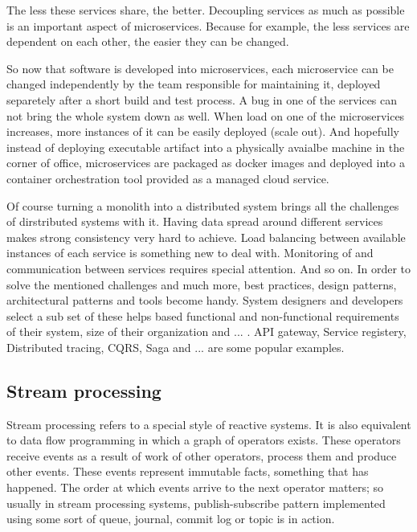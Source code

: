 \documentclass[a4]{report}
\begin{document}
    The less these services share, the better.
    Decoupling services as much as possible is an important aspect of microservices.
    Because for example, the less services are dependent on each other, the easier they can be changed.

    So now that software is developed into microservices, each microservice can be changed independently by the
    team responsible for maintaining it, deployed separetely after a short build and test process.
    A bug in one of the services can not bring the whole system down as well.
    When load on one of the microservices increases, more instances of it can be easily deployed (scale out).
    And hopefully instead of deploying executable artifact into a physically avaialbe machine in the corner of
    office, microservices are packaged as docker images and deployed into a container orchestration tool provided as
    a managed cloud service.

    Of course turning a monolith into a distributed system brings all the challenges of dirstributed systems with it.
    Having data spread around different services makes strong consistency very hard to achieve.
    Load balancing between available instances of each service is something new to deal with.
    Monitoring of and communication between services requires special attention.
    And so on.
    In order to solve the mentioned challenges and much more, best practices, design patterns, architectural patterns
    and tools become handy.
    System designers and developers select a sub set of these helps based functional and non-functional requirements
    of their system, size of their organization and ... .
    API gateway, Service registery, Distributed tracing, CQRS, Saga and ... are some popular examples.

    \subsection{Stream processing \cite{flink} \cite{fast-data-archs}}
    Stream processing refers to a special style of reactive systems.
    It is also equivalent to data flow programming in which a graph of operators exists.
    These operators receive events as a result of work of other operators, process them and produce other events.
    These events represent immutable facts, something that has happened.
    The order at which events arrive to the next operator matters; so usually in stream processing systems,
    publish-subscribe pattern implemented using some sort of queue, journal, commit log or topic is in action.
\end{document}

